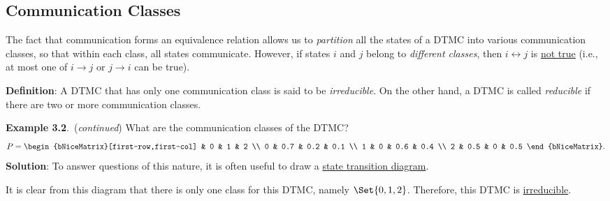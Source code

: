 \subsection*{Communication Classes}
The fact that communication forms an equivalence relation allows us to \emph{partition} all the states
of a DTMC into various communication classes, so that within each class, all states
communicate. However, if states $i$ and $j$ belong to \emph{different classes}, then $ i\leftrightarrow j $ is \underline{not true}
(i.e., at most one of $ i\to j $ or $ j\to i $ can be true).
\begin{Regular}
    \textbf{Definition}: A DTMC that has only one communication class is said to be \emph{irreducible}. On the
    other hand, a DTMC is called \emph{reducible} if there are two or more communication classes.
\end{Regular}
\begin{Example}
    \textbf{Example 3.2}.\ (\emph{continued}) What are the communication classes of the DTMC\@?
    \[ P=\begin{bNiceMatrix}[first-row,first-col]
              & 0   & 1   & 2   \\
            0 & 0.7 & 0.2 & 0.1 \\
            1 & 0   & 0.6 & 0.4 \\
            2 & 0.5 & 0   & 0.5
        \end{bNiceMatrix}. \]
    \tcblower{}
    \textbf{Solution}: To answer questions of this nature, it is often useful to
    draw a \underline{state transition diagram}.
    \begin{center}
    \end{center}
    It is clear from this diagram that there is only one class for this DTMC,
    namely $ \Set{0,1,2} $. Therefore, this DTMC is
    \underline{irreducible}.
\end{Example}
